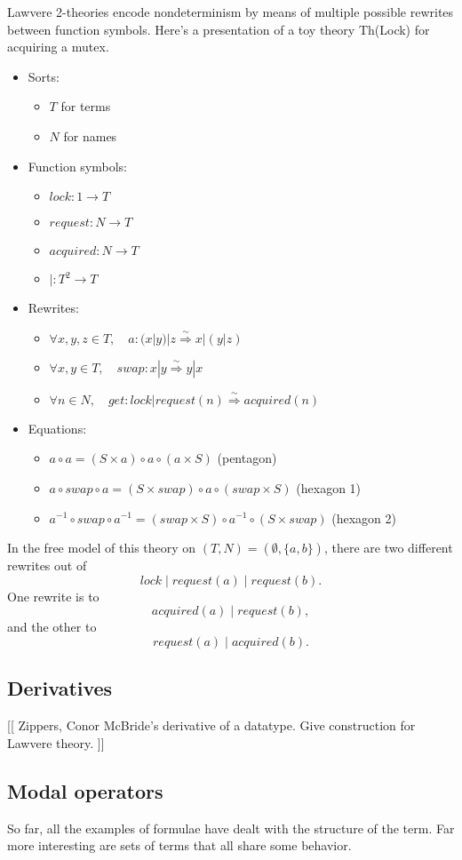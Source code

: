 \documentclass{article}
\newcommand{\maps}{\colon}
\begin{document}
Lawvere 2-theories encode nondeterminism by means of multiple possible rewrites between function symbols.  Here's a presentation of a toy theory Th(Lock) for acquiring a mutex.
\begin{center}
  \begin{itemize}
    \item Sorts:
    \begin{itemize}
      \item $T$ for terms
      \item $N$ for names
    \end{itemize}
    \item Function symbols:
    \begin{itemize}
      \item $lock\maps 1 \to T$
      \item $request\maps N \to T$
      \item $acquired\maps N \to T$
      \item $|\maps T^2 \to T$
    \end{itemize}
    \item Rewrites:
    \begin{itemize}
      \item $\forall x,y,z \in T,\quad a\maps (x|y)|z \stackrel{\sim}{\Rightarrow} x|(y|z)$
      \item $\forall x,y \in T,\quad swap\maps x|y \stackrel{\sim}{\Rightarrow} y|x$
      \item $\forall n \in N,\quad get\maps lock | request(n) \stackrel{\sim}{\Rightarrow} acquired(n)$
    \end{itemize}
    \item Equations:
    \begin{itemize}
      \item $a \circ a = (S \times a) \circ a \circ (a \times S)$ (pentagon)
      \item $a \circ swap \circ a = (S \times swap) \circ a \circ (swap \times S)$ (hexagon 1)
      \item $a^{-1} \circ swap \circ a^{-1} = (swap \times S) \circ a^{-1} \circ (S \times swap)$ (hexagon 2)
    \end{itemize}
  \end{itemize}
\end{center}
In the free model of this theory on $(T, N) = (\emptyset, \{ a,b\})$, there are two different rewrites out of
\[ lock \;|\; request(a) \;|\; request(b). \]
One rewrite is to
\[ acquired(a) \;|\; request(b), \]
and the other to
\[ request(a) \;|\; acquired(b). \]

\subsection{Derivatives}

[[ Zippers, Conor McBride's derivative of a datatype.  Give construction for Lawvere theory. ]]

\subsection{Modal operators}

So far, all the examples of formulae have dealt with the structure of the term.  Far more interesting are sets of terms that all share some behavior.
\end{document}
